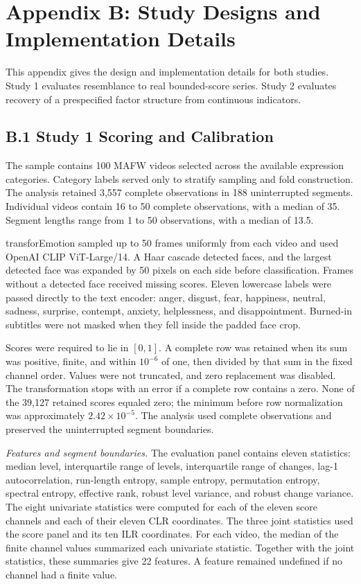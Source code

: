 \documentclass[
]{article}
\begin{document}
\section{Appendix B: Study Designs and Implementation
Details}\label{appendix-b-study-designs-and-implementation-details}

This appendix gives the design and implementation details for both
studies. Study 1 evaluates resemblance to real bounded-score series.
Study 2 evaluates recovery of a prespecified factor structure from
continuous indicators.

\subsection{B.1 Study 1 Scoring and
Calibration}\label{b.1-study-1-scoring-and-calibration}

The sample contains 100 MAFW videos selected across the available
expression categories. Category labels served only to stratify sampling
and fold construction. The analysis retained 3,557 complete observations
in 188 uninterrupted segments. Individual videos contain 16 to 50
complete observations, with a median of 35. Segment lengths range from 1
to 50 observations, with a median of 13.5.

transforEmotion sampled up to 50 frames uniformly from each video and
used OpenAI CLIP ViT-Large/14. A Haar cascade detected faces, and the
largest detected face was expanded by 50 pixels on each side before
classification. Frames without a detected face received missing scores.
Eleven lowercase labels were passed directly to the text encoder: anger,
disgust, fear, happiness, neutral, sadness, surprise, contempt, anxiety,
helplessness, and disappointment. Burned-in subtitles were not masked
when they fell inside the padded face crop.

Scores were required to lie in \([0,1]\). A complete row was retained
when its sum was positive, finite, and within \(10^{-6}\) of one, then
divided by that sum in the fixed channel order. Values were not
truncated, and zero replacement was disabled. The transformation stops
with an error if a complete row contains a zero. None of the 39,127
retained scores equaled zero; the minimum before row normalization was
approximately \(2.42\times10^{-5}\). The analysis used complete
observations and preserved the uninterrupted segment boundaries.

\emph{Features and segment boundaries.} The evaluation panel contains
eleven statistics: median level, interquartile range of levels,
interquartile range of changes, lag-1 autocorrelation, run-length
entropy, sample entropy, permutation entropy, spectral entropy,
effective rank, robust level variance, and robust change variance. The
eight univariate statistics were computed for each of the eleven score
channels and each of their eleven CLR coordinates. The three joint
statistics used the score panel and its ten ILR coordinates. For each
video, the median of the finite channel values summarized each
univariate statistic. Together with the joint statistics, these
summaries give 22 features. A feature remained undefined if no channel
had a finite value.
\end{document}

